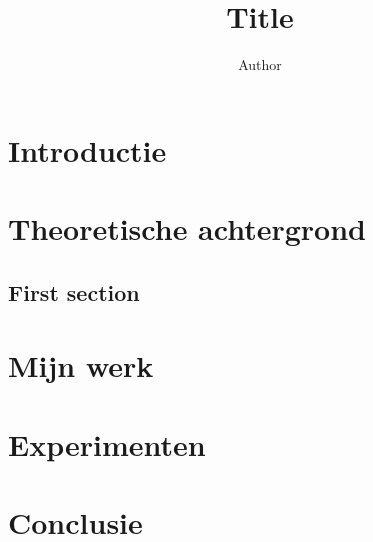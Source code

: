 \documentclass[twoside]{Style/uva-inf-bachelor-thesis}
\title{Title}
\author{Author}
\begin{document}
\maketitle

\begin{abstract}
\end{abstract}

\tableofcontents

\chapter{Introductie}



\chapter{Theoretische achtergrond}
\section{First section}

\chapter{Mijn werk}

\chapter{Experimenten}

\chapter{Conclusie}
\end{document}

